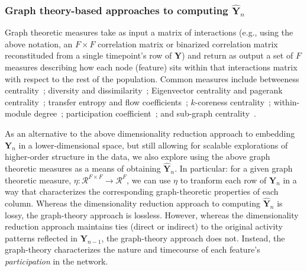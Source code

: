 \documentclass[english]{article}
\begin{document}
\subsubsection*{Graph theory-based approaches to computing
  $\hat{\mathbf{Y}}_n$}

Graph theoretic measures take as input a matrix of interactions (e.g.,
using the above notation, an $F \times F$ correlation matrix or
binarized correlation matrix reconstituded from a single timepoint's
row of $\mathbf{Y}$) and return as output a set of $F$ measures
describing how each node (feature) sits within that interactions
matrix with respect to the rest of the population.  Common measures
include betweeness centrality~\citep[the proportion of shortest paths
between each pair of nodes in the population that involves the given
node in question; e.g., ][]{Newm05, OpsaEtal10, Bart04, GeisEtal08,
  Free77}; diversity and dissimilarity~\citep[characterizations of how
differently connected a given node is from others in the population;
e.g., ][]{Rao82, Lin09, RicoSzei06}; Eigenvector centrality and
pagerank centrality~\citep[measures of how influential a given node is
within the broader network; e.g., ][]{Newm08, Bona07, LohmEtal10,
  HaluEtal13}; transfer entropy and flow coefficients~\citep[a measure
of how much information is flowing from a given node to other nodes in
the network; e.g., ][]{HoneEtal07, Schr00}; $k$-coreness
centrality~\citep[a measure of the connectivity of a node within its
local sub-graph; e.g., ][]{AlvaEtal05, ChriFowl10}; within-module
degree~\citep[a measure of how many connections a node has to its
close neighbors in the network; e.g., ][]{RubiSpor10}; participation
coefficient~\citep[a measure of the diversity of a node's connections
to different sub-graphs in the network; e.g., ][]{RubiSpor10}; and
sub-graph centrality~\citep[a measure of a node's participation in all
of the network's sub-graphs; e.g., ][]{EstrRodr05}.

As an alternative to the above dimensionality reduction approach to
embedding $\mathbf{Y}_n$ in a lower-dimensional space, but still
allowing for scalable explorations of higher-order structure in the
data, we also explore using the above graph theoretic measures as a
means of obtaining $\hat{\mathbf{Y}}_n$.  In particular: for a given
graph theoretic measure, $\eta: \mathcal{R}^{F \times F} \rightarrow
\mathcal{R}^F$, we can use $\eta$ to tranform each row of
$\mathbf{Y}_n$ in a way that characterizes the corresponding
graph-theoretic properties of each column.  Whereas the dimensionality
reduction approach to computing $\hat{\mathbf{Y}}_n$ is lossy,
the graph-theory approach is lossless.  However, whereas the
dimensionality reduction approach maintains ties (direct or indirect)
to the original activity patterns reflected in $\mathbf{Y}_{n-1}$, the
graph-theory approach does not.  Instead, the graph-theory
characterizes the nature and timecourse of each feature's
\textit{participation} in the network.
\end{document}
